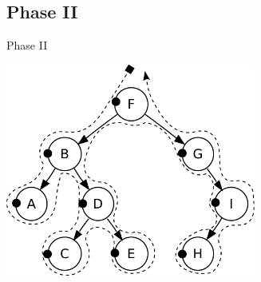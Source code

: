 \documentclass[%
	sans,
	12pt,
]{beamer}
\begin{document}
\subsection{Phase II}
\begin{frame}{Phase II}
\begin{center}
\includegraphics[height=7cm]{Sorted_binary_tree_preorder}
\end{center}
\end{frame}
\end{document}
